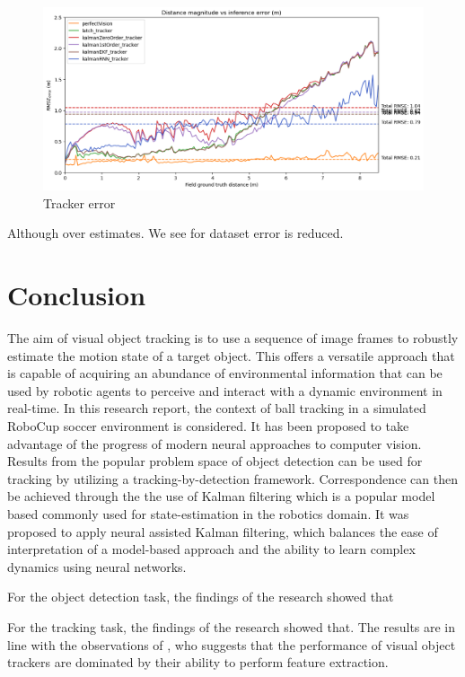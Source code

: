 \documentclass[a4paper,twoside,12pt]{report}
\begin{document}
\begin{figure}[h!]
\begin{center}
\includegraphics[width=13cm]{images/eval_error.png}
\caption{Tracker error}
\label{fig:ekferror}
\end{center}
\end{figure}

Although over estimates. We see for dataset error is reduced.

\chapter{Conclusion}

The aim of visual object tracking is to use a sequence of image frames to robustly estimate the motion state of a target object. This offers a versatile approach that is capable of acquiring an abundance of environmental information that can be used by robotic agents to perceive and interact with a dynamic environment in real-time. In this research report, the context of ball tracking in a simulated RoboCup soccer environment is considered. It has been proposed to take advantage of the progress of modern neural approaches to computer vision. Results from the popular problem space of object detection can be used for tracking by utilizing a tracking-by-detection framework. Correspondence can then be achieved through the the use of Kalman filtering which is a popular model based commonly used for state-estimation in the robotics domain. It was proposed to apply neural assisted Kalman filtering, which balances the ease of interpretation of a model-based approach and the ability to learn complex dynamics using neural networks. 

For the object detection task, the findings of the research showed that

For the tracking task, the findings of the research showed that. The results are in line with the observations of \cite{diagnosingtrack}, who suggests that the performance of visual object trackers are dominated by their ability to perform feature extraction.
\end{document}
